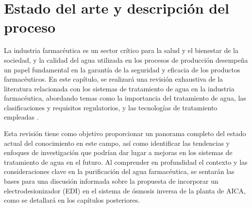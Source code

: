 \chapter{Estado del arte y descripción del proceso}
\vspace{-2cm} 
La industria farmacéutica es un sector crítico para la salud y el bienestar de la sociedad, y la calidad del agua utilizada
en los procesos de producción desempeña un papel fundamental en la garantía de la seguridad y eficacia de los productos farmacéuticos. En este capítulo,
se realizará una revisión exhaustiva de la literatura relacionada con los sistemas de tratamiento de agua en la industria farmacéutica, abordando temas
como la importancia del tratamiento de agua, las clasificaciones y requisitos regulatorios, y las tecnologías de tratamiento empleadas \cite{juanantoniodelacuerdaImportanciaAguaIndustria2021}.
 
Esta revisión tiene como objetivo proporcionar un panorama completo del estado actual del conocimiento en este campo, así como identificar las tendencias y enfoques de investigación que podrían dar lugar a mejoras en los sistemas de tratamiento de agua en el futuro. Al comprender en profundidad el contexto y las consideraciones clave en la purificación del agua farmacéutica, se sentarán las bases para una discusión informada sobre la propuesta de incorporar un electrodesionizador (EDI) en el sistema de ósmosis inversa de la planta de AICA, como se detallará en los capítulos posteriores.


